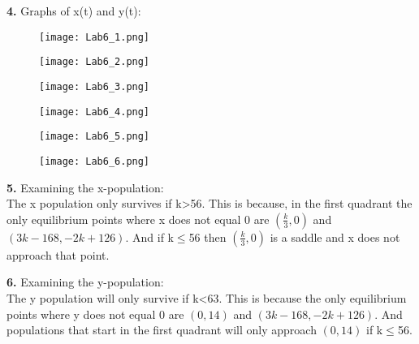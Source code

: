 \documentclass[english]{article}
\begin{document}
\begin{flushleft}
\textbf{4.} Graphs of x(t) and y(t):\\

\begin{figure}[H]
\centering
\begin{minipage}{.5\textwidth}
  \centering
  \texttt{[image: Lab6\_1.png]}
  \label{fig:test1}
\end{minipage}%
\begin{minipage}{.5\textwidth}
  \centering
  \texttt{[image: Lab6\_2.png]}
  \label{fig:test2}
\end{minipage}
\end{figure}

\begin{figure}[H]
\centering
\begin{minipage}{.5\textwidth}
  \centering
  \texttt{[image: Lab6\_3.png]}
  \label{fig:test1}
\end{minipage}%
\begin{minipage}{.5\textwidth}
  \centering
  \texttt{[image: Lab6\_4.png]}
  \label{fig:test2}
\end{minipage}
\end{figure}

\begin{figure}[H]
\centering
\begin{minipage}{.5\textwidth}
  \centering
  \texttt{[image: Lab6\_5.png]}
  \label{fig:test1}
\end{minipage}%
\begin{minipage}{.5\textwidth}
  \centering
  \texttt{[image: Lab6\_6.png]}
  \label{fig:test2}
\end{minipage}
\end{figure}

\textbf{5.} Examining the x-population:\\
The x population only survives if k>56. This is because, in the first quadrant the only equilibrium points where x does not equal 0 are $(\frac{k}{3},0)$ and $(3k-168,-2k+126)$. And if k$\leq$56 then $(\frac{k}{3},0)$ is a saddle and x does not approach that point.

\textbf{6.} Examining the y-population:\\
The y population will only survive if k<63. This is because the only equilibrium points where y does not equal 0 are $(0,14)$ and $(3k-168,-2k+126)$. And populations that start in the first quadrant will only approach $(0,14)$ if k$\leq$56.


\end{flushleft}
\end{document}
